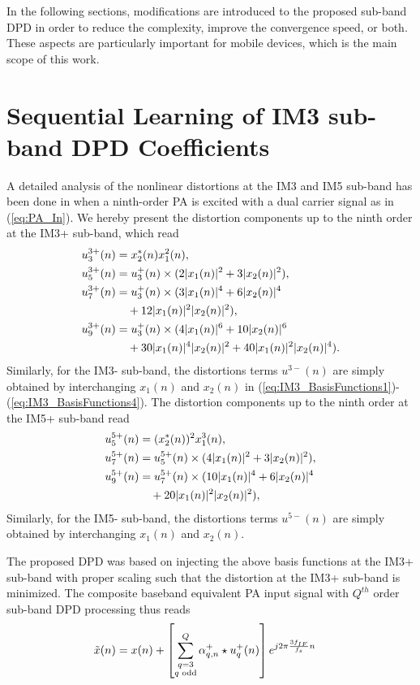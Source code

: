 In the following sections, modifications are introduced to the proposed sub-band DPD in order to reduce the complexity, improve the convergence speed, or both. 
These aspects are particularly important for mobile devices, which is the main scope of this work.

\section{Sequential Learning of IM3 sub-band DPD Coefficients}
\label{sec:Sequential_Learning}
A detailed analysis of the nonlinear distortions at the IM3 and IM5 sub-band has been done in \cite{TMTT_SubbandDPD} when a ninth-order PA is excited with a dual carrier signal as in (\ref{eq:PA_In}). 
We hereby present the distortion components up to the ninth order at the IM3+ sub-band, which read
\begin{align}
\small
u^{3+}_3(n) &= x_2^*(n)x_1^2(n), \label{eq:IM3_BasisFunctions1}\\
u^{3+}_5(n) &= u^+_3(n) \times (2 |x_1(n)|^2 + 3 |x_2(n)|^2),  \label{eq:IM3_BasisFunctions2}\\
u^{3+}_7(n) &= u^+_3(n) \times (3 |x_1(n)|^4 + 6 |x_2(n)|^4 \nonumber\\
& \quad + 12 |x_1(n)|^2 |x_2(n)|^2) \label{eq:IM3_BasisFunctions3},\\
u^{3+}_9(n) &= u^+_3(n) \times (4 |x_1(n)|^6 + 10|x_2(n)|^6 \nonumber\\
&\quad + 30 |x_1(n)|^4 |x_2(n)|^2 + 40 |x_1(n)|^2 |x_2(n)|^4). \label{eq:IM3_BasisFunctions4}
\end{align}
\normalsize
Similarly, for the IM3- sub-band, the distortions terms $u^{3-}(n)$ are simply obtained by interchanging $x_1(n)$ and $x_2(n)$ in (\ref{eq:IM3_BasisFunctions1})-(\ref{eq:IM3_BasisFunctions4}).
The distortion components up to the ninth order at the IM5+ sub-band read
\begin{align}
\small
u^{5+}_5(n) &= (x_2^*(n))^2x_1^3(n),\\
u^{5+}_7(n) &= u^{5+}_5(n) \times (4 |x_1(n)|^2 + 3 |x_2(n)|^2),  \\
u^{5+}_9(n) &= u^{5+}_7(n) \times (10 |x_1(n)|^4 + 6 |x_2(n)|^4 \nonumber\\
& \quad + 20 |x_1(n)|^2 |x_2(n)|^2),\\
\end{align}
\normalsize
Similarly, for the IM5- sub-band, the distortions terms $u^{5-}(n)$ are simply obtained by interchanging $x_1(n)$ and $x_2(n)$.

The proposed DPD was based on injecting the above basis functions at the IM3+ sub-band with proper scaling such that the distortion at the IM3+ sub-band is minimized. 
The composite baseband equivalent PA input signal with $Q^{th}$ order sub-band DPD processing thus reads 
\begin{align}
\small
\tilde{x}(n) &=  x(n) + \left[\sum_{\substack{q=3 \\ q \text{ odd}}}^{Q} \alpha^+_{q,n} \star  u^+_q(n)\right]e^{j 2\pi \frac{3 f_{IF}}{f_s} n}
\label{eq:PA_In_with_IM3_DPD}
\end{align}
\normalsize

